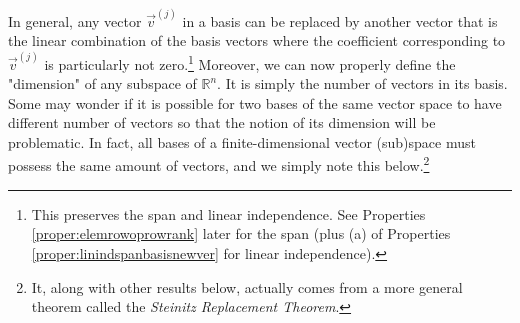 In general, any vector $\vec{v}^{(j)}$ in a basis can be replaced by another vector that is the linear combination of the basis vectors where the coefficient corresponding to $\vec{v}^{(j)}$ is particularly not zero.\footnote{\label{foot:ft14}This preserves the span and linear independence. See Properties \ref{proper:elemrowoprowrank} later for the span (plus (a) of Properties \ref{proper:linindspanbasisnewver} for linear independence).} Moreover, we can now properly define the "dimension" of any subspace of $\mathbb{R}^n$. It is simply the number of vectors in its basis. Some may wonder if it is possible for two bases of the same vector space to have different number of vectors so that the notion of its dimension will be problematic. In fact, all bases of a finite-dimensional vector (sub)space must possess the same amount of vectors, and we simply note this below.\footnote{It, along with other results below, actually comes from a more general theorem called the \textit{Steinitz Replacement Theorem}.} %

